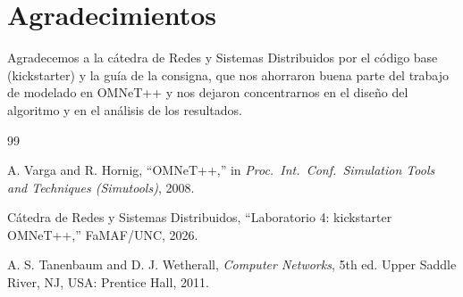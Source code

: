 \documentclass[10pt,letterpaper,twocolumn]{article}
\begin{document}
\section*{Agradecimientos}

Agradecemos a la cátedra de Redes y Sistemas Distribuidos por el código base
(kickstarter) y la guía de la consigna, que nos ahorraron buena parte del
trabajo de modelado en OMNeT++ y nos dejaron concentrarnos en el diseño del
algoritmo y en el análisis de los resultados.

\begin{thebibliography}{99}

A. Varga and R. Hornig,
``OMNeT++,''
in \emph{Proc.\ Int.\ Conf.\ Simulation Tools and Techniques (Simutools)}, 2008.

Cátedra de Redes y Sistemas Distribuidos,
``Laboratorio 4: kickstarter OMNeT++,''
FaMAF/UNC, 2026.

A. S. Tanenbaum and D. J. Wetherall,
\emph{Computer Networks}, 5th ed.
Upper Saddle River, NJ, USA: Prentice Hall, 2011.

\end{thebibliography}
\end{document}

